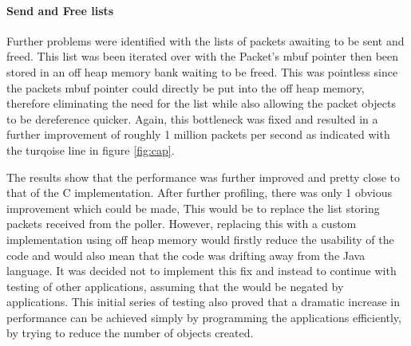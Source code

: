 \documentclass[final_report.tex]{subfiles}
\begin{document}
\paragraph*{Send and Free lists} Further problems were identified with the lists of packets awaiting to be sent and freed. This list was been iterated over with the Packet's mbuf pointer then been stored in an off heap memory bank waiting to be freed. This was pointless since the packets mbuf pointer could directly be put into the off heap memory, therefore eliminating the need for the list while also allowing the packet objects to be dereference quicker. Again, this bottleneck was fixed and resulted in a further improvement of roughly 1 million packets per second as indicated with the turqoise line in figure \ref{fig:cap}.

The results show that the performance was further improved and pretty close to that of the C implementation. After further profiling, there was only 1 obvious improvement which could be made, This would be to replace the list storing packets received from the poller. However, replacing this with a custom implementation using off heap memory would firstly reduce the usability of the code and would also mean that the code was drifting away from the Java language. It was decided not to implement this fix and instead to continue with testing of other applications, assuming that the would be negated by applications. This initial series of testing also proved that a dramatic increase in performance can be achieved simply by programming the applications efficiently, by trying to reduce the number of objects created.
\end{document}
